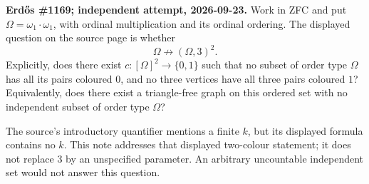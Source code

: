 \textbf{Erd\H{o}s \#1169; independent attempt, 2026-09-23.}
Work in ZFC and put $\Omega=\omega_1\cdot\omega_1$, with ordinal multiplication and its ordinal ordering. The displayed question on the source page is whether
\[
\Omega\not\longrightarrow(\Omega,3)^2.
\]
Explicitly, does there exist $c:[\Omega]^2\to\{0,1\}$ such that no subset of order type $\Omega$ has all its pairs coloured $0$, and no three vertices have all three pairs coloured $1$? Equivalently, does there exist a triangle-free graph on this ordered set with no independent subset of order type $\Omega$?

The source's introductory quantifier mentions a finite $k$, but its displayed formula contains no $k$. This note addresses that displayed two-colour statement; it does not replace $3$ by an unspecified parameter. An arbitrary uncountable independent set would not answer this question.
